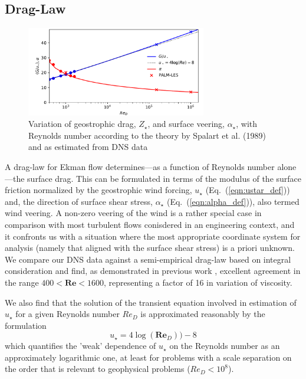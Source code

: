 \documentclass[a4paper,11pt]{amsart}
\begin{document}
\subsection{Drag-Law}
\label{sec:drag-law}
\begin{figure}
  \centerline{\includegraphics[width=0.7\textwidth]{../plot/ustar_alpha.pdf}}
  \caption{Variation of geostrophic drag, $Z_\star$, and surface veering, $\alpha_\star$, with Reynolds number according to
    the theory by Spalart et al. (1989) and as estimated from DNS data
    \label{fig:drag_law}}
\end{figure}
A drag-law for Ekman flow determines---as a function of Reynolds number alone---the surface drag.
%
This can be formulated in terms of the modulus
of the surface friction normalized by the geostrophic wind forcing, $u_\star$ (Eq.~(\ref{eqn:ustar_def}))
and, the direction of surface shear stress, $\alpha_\star$ (Eq.~(\ref{eqn:alpha_def})),
also termed wind veering. 
%
A non-zero veering of the wind is a rather special case in comparison with most turbulent flows conisdered in an
engineering context, and it confronts us with a situation where the most appropriate coordinate system
for analysis (namely that aligned with the surface shear stress) is a priori unknown. 
%
We compare our DNS data against a semi-empirical drag-law based on integral consideration \cite{spalart:JFM1989}
and find, as demonstrated in previous work \cite{ansorge:BM2014}, excellent agreement in the range
 $400<\mathbf{Re}<1600$, representing a factor of 16 in variation of viscosity. 
%
\par
%
We also find that the solution of the transient equation involved in estimation of $u_\star$ for a given Reynolds number
$Re_D$ is approximated reasonably by the formulation
\begin{equation}
  u_\star= 4\log(\mathbf{Re}_D))-8
\end{equation}
which quantifies the 'weak' dependence of $u_\star$ on the Reynolds number as an approximately logarithmic one, at least
for problems with a scale separation on the order that is relevant to geophysical problems ($Re_D<10^{8}$).  
%
%
\end{document}
